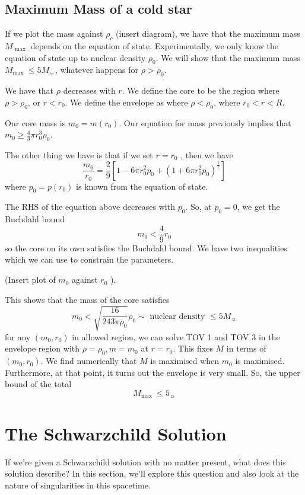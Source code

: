 \documentclass[11pt, oneside]{article}   	%
\theoremstyle{slanted}
\begin{document}
\subsection{Maximum Mass of a cold star}
If we plot the mass against $ \rho _ c $ (insert diagram), 
we have that the maximum mass $ M _{ \text{ max } } $ depends on 
the equation of state. 
Experimentally, we only 
know the equation of state up to 
nuclear density $ \rho _ 0 $. 
We will show that the maximum mass $ M _{ \text{max } } \leq 5 M_{ \sun } $, 
whatever happens for $ \rho > \rho _ 0 $. 

We have that $ \rho $ decreases with $ r$. 
We define the core to be the region where $ \rho > \rho _ 0$, 
or $ r < r_ 0 $. 
We define the envelope as where $ \rho < \rho _0 $, where $ r_0 < r < R $. 

Our core mass is $ m_0 = m ( r_0 ) $. 
Our equation for mass previously
implies that $ m_0 \ge  \frac{4}{3 }  \pi r_0 ^ 3 \rho _ 0 $. 

The other thing we have is that 
if we set $ r = r_0  $ , then we have 
\[
\frac{m_0}{r_0 }  = \frac{2}{9}  \left[  
1 - 6 \pi r_0 ^ 2 p_0 + \left( 1 + 6 \pi r_0 ^ 2 p_0  \right)  ^{ \frac{1}{2} } \right] 
\] where $ p_0 = p ( r_0 ) $ is known 
from the equation of state. 

The RHS of the equation above 
decreases with $ p_0 $. So, at $ p_0  =0 $, we get the Buchdahl bound
\[
m_0 < \frac{4}{9 } r_0 
\] so the core on its own satisfies the Buchdahl bound. 
We have two inequalities which we can use to constrain 
the parameters. 

(Insert plot of $ m_0  $ against $ r_0 $  ). 

This shows that the mass of the 
core satisfies 
\[
m_0  < \sqrt{ \frac{ 16 }{ 243 \pi \rho _ 0 } }  \rho_0 \sim \text{ nuclear density }
\le  5 M _{ \sun }
\] for any $ \left( m_0 , r_0  \right)  $ in allowed region, 
we can solve TOV 1 and TOV 3 in the envelope region with 
$ \rho = \rho _ 0 , m = m_0 $  at $ r= r_0 $. 
This fixes $ M $ in terms of $ \left( m_0 , r_0  \right)  $. 
We find numerically that $ M $ is maximised when $ m_0 $ is 
maximised. Furthermore, at that point, it turns out 
the envelope is very small. So, the upper bound of the 
total 
\[
M_{ \text{max } } \le  5 _{ \sun }
\]

\section{The Schwarzchild Solution}
If we're given a Schwarzchild solution 
with no matter present, what does this solution describe?
In this section, we'll explore this 
question and also look at the nature 
of singularities in this spacetime. 
\end{document}
